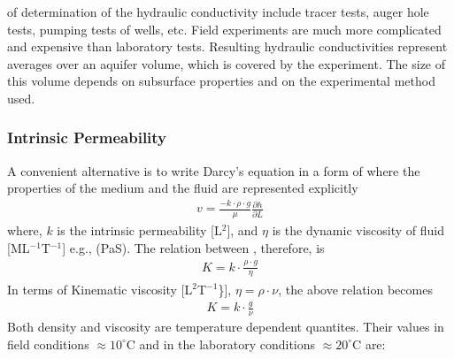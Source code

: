 \documentclass[letterpaper,10pt,english]{sphinxmanual}
\begin{document}
 of determination of the hydraulic conductivity include tracer tests, auger hole tests, pumping tests of wells, etc. Field experiments are much more complicated and expensive than laboratory tests. Resulting hydraulic conductivities represent averages over an aquifer volume, which is covered by the experiment. The size of this
volume depends on subsurface properties and on the experimental method used.


\subsubsection{Intrinsic Permeability}
\label{\detokenize{contents/flow/lecture_04/14_darcy_law_K:intrinsic-permeability}}
A convenient alternative is to write Darcy’s equation in a form of 
where the properties of the medium and the fluid are represented explicitly
\begin{equation*}
\begin{split}
v = \frac{-k \cdot \rho\cdot g}{\mu}\frac{\partial h}{\partial L}
\end{split}
\end{equation*}
where, \(k\) is the intrinsic permeability {[}L\(^2\){]}, and \(\eta\) is the dynamic viscosity of fluid {[}ML\(^{-1}\)T\(^{-1}\){]} e.g., (Pa\sphinxhyphen{}S). The relation between  , therefore, is
\begin{equation*}
\begin{split}
K = k\cdot \frac{ \rho \cdot g}{\eta}
\end{split}
\end{equation*}
In terms of Kinematic viscosity {[}L\(^2\)T\(^{-1}\)\}{]}, \(\eta = \rho \cdot \nu\), the above relation becomes
\begin{equation*}
\begin{split}
K = k\cdot \frac{ g}{\nu}
\end{split}
\end{equation*}
Both density and viscosity are temperature dependent quantites. Their values in field conditions \(\approx 10 ^\circ\)C and in the laboratory conditions \(\approx 20 ^\circ\)C are:
\end{document}
